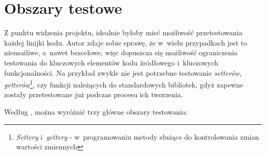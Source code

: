 \section{Obszary testowe}
\label{obszary_testowe}
Z punktu widzenia projektu, idealnie byłoby mieć możliwość przetestowania każdej linijki kodu. Autor zdaje sobie sprawę, że w~wielu przypadkach jest to niemożliwe, a~nawet bezcelowe, więc dopuszcza się możliwość ograniczenia testowania do kluczowych elementów kodu źródłowego i~kluczowych funkcjonalności. Na przykład zwykle nie jest potrzebne testowanie \textit{setterów}, \textit{getterów}\footnote{\textit{Settery} i~\textit{gettery} - w~programowaniu metody służące do kontrolowania zmian wartości zmiennych}, czy funkcji należących do standardowych bibliotek, gdyż zapewne zostały przetestowane już podczas procesu ich tworzenia. 

Według \cite{bib:android:testing:learning}, można wyróżnić trzy główne obszary testowania:

